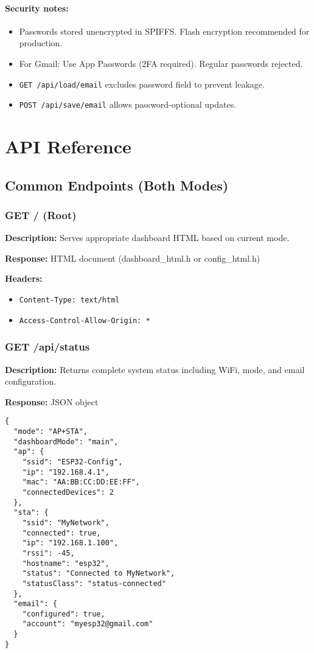 \documentclass[11pt,a4paper]{article}
\begin{document}
\paragraph{Security notes:}
\begin{itemize}[leftmargin=*]
  \item Passwords stored unencrypted in SPIFFS. Flash encryption recommended for production.
  \item For Gmail: Use App Passwords (2FA required). Regular passwords rejected.
  \item \texttt{GET /api/load/email} excludes password field to prevent leakage.
  \item \texttt{POST /api/save/email} allows password-optional updates.
\end{itemize}

\section{API Reference}

\subsection{Common Endpoints (Both Modes)}

\subsubsection{GET / (Root)}
\textbf{Description:} Serves appropriate dashboard HTML based on current mode.

\textbf{Response:} HTML document (dashboard\_html.h or config\_html.h)

\textbf{Headers:}
\begin{itemize}[leftmargin=*]
  \item \texttt{Content-Type: text/html}
  \item \texttt{Access-Control-Allow-Origin: *}
\end{itemize}

\subsubsection{GET /api/status}
\textbf{Description:} Returns complete system status including WiFi, mode, and email configuration.

\textbf{Response:} JSON object
\begin{verbatim}
{
  "mode": "AP+STA",
  "dashboardMode": "main",
  "ap": {
    "ssid": "ESP32-Config",
    "ip": "192.168.4.1",
    "mac": "AA:BB:CC:DD:EE:FF",
    "connectedDevices": 2
  },
  "sta": {
    "ssid": "MyNetwork",
    "connected": true,
    "ip": "192.168.1.100",
    "rssi": -45,
    "hostname": "esp32",
    "status": "Connected to MyNetwork",
    "statusClass": "status-connected"
  },
  "email": {
    "configured": true,
    "account": "myesp32@gmail.com"
  }
}
\end{verbatim}
\end{document}
